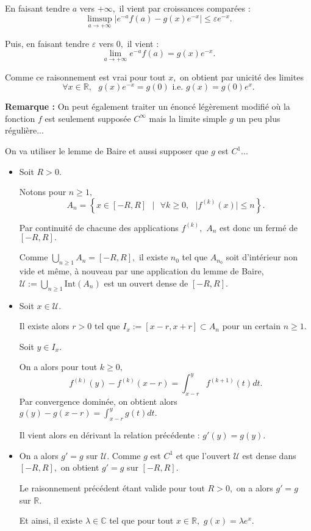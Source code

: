 En faisant tendre $a$ vers $+\infty,$ il vient par croissances comparées :  $$\limsup_{a\rightarrow +\infty}\vert e^{-a}f(a)-g(x)e^{-x}\vert\leq \varepsilon e^{-x}.$$

Puis, en faisant tendre $\varepsilon$ vers $0,$ il vient : $$\lim_{a\rightarrow +\infty} e^{-a}f(a)=g(x)e^{-x}.$$

Comme ce raisonnement est vrai pour tout $x,$ on obtient par unicité des limites $$\forall x\in \mathbb{R},\mbox{ } g(x)e^{-x}=g(0) \mbox{ i.e. } g(x)=g(0)e^{x}.$$

\textbf{Remarque : } On peut également traiter un énoncé légèrement modifié où la fonction $f$ est seulement supposée $C^{\infty}$ mais la limite simple $g$ un peu plus régulière...

On va utiliser le lemme de Baire et aussi supposer que $g$ est $C^{1}$... 

\begin{itemize}
\item Soit $R>0.$

Notons pour $n\geq 1,$ $$A_{n}=\left\{x \in  [-R,R]\mbox{ }|\mbox{ } \forall k\geq 0,\mbox{ } \vert f^{(k)}(x)\vert \leq n \right\}.$$

Par continuité de chacune des applications $f^{(k)},$ $A_{n}$ est donc un fermé de $[-R,R].$

Comme $\displaystyle \bigcup_{n\geq 1}A_{n}=[-R,R],$ il existe $n_{0}$ tel que $A_{n_{0}}$ soit d'intérieur non vide et même, à nouveau par une application du lemme de Baire, $\mathcal{U}:=\displaystyle \bigcup_{n\geq 1}\mbox{Int}(A_{n})$ est un ouvert dense de $[-R,R].$

\item Soit $x\in\mathcal{U}.$ 

Il existe alors $r>0$ tel que $I_{x}:=[x-r,x+r]\subset A_{n}$ pour un certain $n\geq 1.$

Soit $y\in I_{x}.$ 

On a alors pour tout $k\geq 0,$ $$f^{(k)}(y)-f^{(k)}(x-r)=\int_{x-r}^{y}f^{(k+1)}(t)dt.$$ Par convergence dominée, on obtient alors $\displaystyle g(y)-g(x-r)=\int_{x-r}^{y}g(t)dt.$

Il vient alors en dérivant la relation précédente : $g'(y)=g(y).$ 

\item On a alors $g'=g$ sur $\mathcal{U}.$ Comme $g$ est $C^{1}$ et que l'ouvert $\mathcal{U}$ est dense dans $[-R,R],$ on obtient $g'=g$ sur $[-R,R].$

Le raisonnement précédent étant valide pour tout $R>0,$ on a alors $g'=g$ sur $\mathbb{R}.$

Et ainsi, il existe $\lambda\in \mathbb{C}$ tel que pour tout $x\in\mathbb{R},$ $\displaystyle g(x)=\lambda e^{x}.$
\end{itemize}

